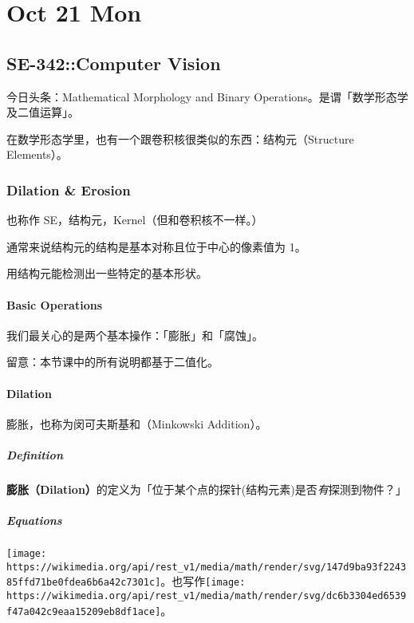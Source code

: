 \documentclass[
]{article}
\date{}
\begin{document}
\hypertarget{header-n0}{%
\section{Oct 21 Mon}\label{header-n0}}

\hypertarget{header-n2}{%
\subsection{SE-342::Computer Vision}\label{header-n2}}

今日头条：Mathematical Morphology and Binary
Operations。是谓「数学形态学及二值运算」。

在数学形态学里，也有一个跟卷积核很类似的东西：结构元（Structure
Elements）。

\hypertarget{header-n5}{%
\subsubsection{Dilation \& Erosion}\label{header-n5}}

也称作 SE，结构元，Kernel（但和卷积核不一样。）

通常来说结构元的结构是基本对称且位于中心的像素值为 1。

用结构元能检测出一些特定的基本形状。

\hypertarget{header-n9}{%
\paragraph{Basic Operations}\label{header-n9}}

我们最关心的是两个基本操作：「膨胀」和「腐蚀」。

留意：本节课中的所有说明都基于二值化。

\hypertarget{header-n12}{%
\paragraph{Dilation}\label{header-n12}}

膨胀，也称为闵可夫斯基和（Minkowski Addition）。

\hypertarget{header-n14}{%
\subparagraph{Definition}\label{header-n14}}

\textbf{膨胀（Dilation）}的定义为「位于某个点的探针(结构元素)是否\emph{有}探测到物件？」

\hypertarget{header-n16}{%
\subparagraph{Equations}\label{header-n16}}

\texttt{[image: https://wikimedia.org/api/rest\_v1/media/math/render/svg/147d9ba93f224385ffd71be0fdea6b6a42c7301c]}。也写作\texttt{[image: https://wikimedia.org/api/rest\_v1/media/math/render/svg/dc6b3304ed6539f47a042c9eaa15209eb8df1ace]}。
\end{document}
